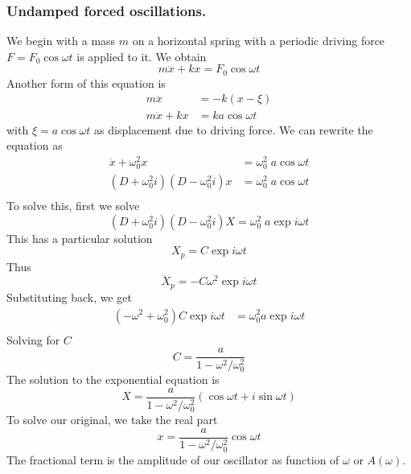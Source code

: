 \documentclass[../main.tex]{subfiles}
\begin{document}
\subsubsection*{Undamped forced oscillations.} We begin with a mass $m$ on a horizontal spring with a periodic driving force $F = F_0 \cos \omega t$ is applied to it. We obtain
\begin{equation*}
    m\ddot{x}+kx=F_0 \cos \omega t
\end{equation*}
Another form of this equation is 
\begin{align*}
    m\ddot{x}&=-k(x-\xi)\\
    m\ddot{x}+kx&=ka \cos \omega t
\end{align*}
with $\xi=a \cos \omega t$ as displacement due to driving force. We can rewrite the equation as
\begin{align*}
    \ddot{x}+\omega_0^2x&=\omega_0^2\;a \cos \omega t\\
    (D+\omega_0^2i)(D-\omega_0^2i)x&=\omega_0^2\;a\cos \omega t\\
\end{align*}
To solve this, first we solve 
\begin{equation*}
    (D+\omega_0^2i)(D-\omega_0^2i)X=\omega_0^2\;a\exp i\omega t
\end{equation*}
This has a particular solution
\begin{equation*}
    X_p=C\exp{i\omega t}
\end{equation*}
Thus
\begin{equation*}
    \ddot{X}_p=-C\omega^2\exp{i\omega t}
\end{equation*}
Substituting back, we get
\begin{align*}
    (-\omega^2+\omega_0^2)C\exp{i\omega t}&=\omega_0^2a\exp{i\omega t}\\
\end{align*}
Solving for $C$
\begin{equation*}
    C=\frac{a}{1-\omega^2/\omega_0^2}
\end{equation*}
The solution to the exponential equation is 
\begin{equation*}
    X=\frac{a}{1-\omega^2/\omega_0^2}(\cos\omega t+i\sin \omega t)
\end{equation*}
To solve our original, we take the real part 
\begin{equation*}
    x=\frac{a}{1-\omega^2/\omega_0^2}\cos\omega t
\end{equation*}
The fractional term is the amplitude of our oscillator as function of $\omega$ or $A(\omega)$.
\end{document}
